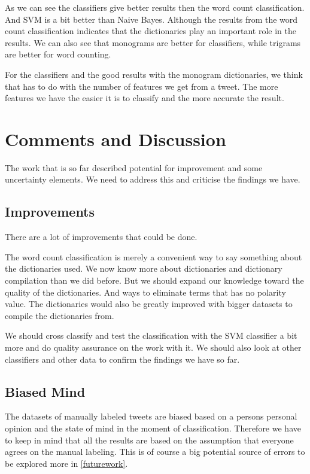 As we can see the classifiers give better results then the word count
classification. And SVM is a bit better than Naive Bayes. Although the results
from the word count classification indicates that the dictionaries play an
important role in the results. We can also see that monograms are better for
classifiers, while trigrams are better for word counting.

For the classifiers and the good results with the monogram dictionaries, we think
that has to do with the number of features we get from a tweet. The more
features we have the easier it is to classify and the more accurate the result. 
%

\section{Comments and Discussion}\label{sentiment:comments_discussion}
The work that is so far described potential for improvement and some
uncertainty elements. We need to address this and criticise the findings we
have.  

\subsection{Improvements}
There are a lot of improvements that could be done. 

The word count classification is merely a convenient way to say something about
the dictionaries used. We now know more about dictionaries and dictionary
compilation than we did before. But we should expand our knowledge toward the
quality of the dictionaries. And ways to eliminate terms that has no polarity
value. The dictionaries would also be greatly improved with bigger datasets to
compile the dictionaries from. 

We should cross classify and test the classification with the SVM classifier a
bit more and do quality assurance on the work with it. We should also look at
other classifiers and other data to confirm the findings we have so far. 

\subsection{Biased Mind}
The datasets of manually labeled tweets are biased based on a persons 
personal opinion and the state of mind in the moment of classification.
Therefore we have to keep in mind that all the results are based on the
assumption that everyone agrees on the manual labeling. This is of course a big
potential source of errors to be explored more in \ref{futurework}.

